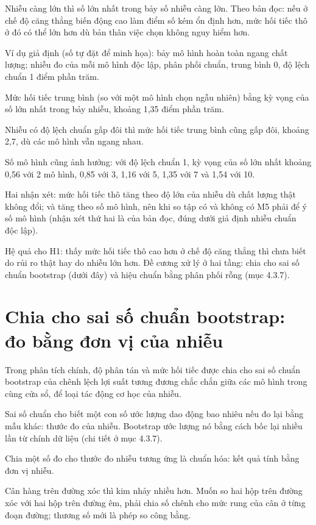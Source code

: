 Nhiễu càng lớn thì số lớn nhất trong bảy số nhiễu càng lớn. Theo bản đọc: nếu ở chế độ căng thẳng biến động cao làm điểm số kém ổn định hơn, mức hối tiếc thô ở đó có thể lớn hơn dù bản thân việc chọn không nguy hiểm hơn.

\begin{tcolorbox}[breakable]
Ví dụ giả định (số tự đặt để minh họa): bảy mô hình hoàn toàn ngang chất lượng; nhiễu đo của mỗi mô hình độc lập, phân phối chuẩn, trung bình 0, độ lệch chuẩn 1 điểm phần trăm.

Mức hối tiếc trung bình (so với một mô hình chọn ngẫu nhiên) bằng kỳ vọng của số lớn nhất trong bảy nhiễu, khoảng 1,35 điểm phần trăm.

Nhiễu có độ lệch chuẩn gấp đôi thì mức hối tiếc trung bình cũng gấp đôi, khoảng 2,7, dù các mô hình vẫn ngang nhau.

Số mô hình cũng ảnh hưởng: với độ lệch chuẩn 1, kỳ vọng của số lớn nhất khoảng 0,56 với 2 mô hình, 0,85 với 3, 1,16 với 5, 1,35 với 7 và 1,54 với 10.
\end{tcolorbox}

Hai nhận xét: mức hối tiếc thô tăng theo độ lớn của nhiễu dù chất lượng thật không đổi; và tăng theo số mô hình, nên khi so tập có và không có M5 phải để ý số mô hình (nhận xét thứ hai là của bản đọc, đúng dưới giả định nhiễu chuẩn độc lập).

Hệ quả cho H1: thấy mức hối tiếc thô cao hơn ở chế độ căng thẳng thì chưa biết do rủi ro thật hay do nhiễu lớn hơn. Đề cương xử lý ở hai tầng: chia cho sai số chuẩn bootstrap (dưới đây) và hiệu chuẩn bằng phân phối rỗng (mục 4.3.7).

\section{Chia cho sai số chuẩn bootstrap: đo bằng đơn vị của nhiễu}

Trong phân tích chính, độ phân tán và mức hối tiếc được chia cho sai số chuẩn bootstrap của chênh lệch lợi suất tương đương chắc chắn giữa các mô hình trong cùng cửa sổ, để loại tác động cơ học của nhiễu.

Sai số chuẩn cho biết một con số ước lượng dao động bao nhiêu nếu đo lại bằng mẫu khác: thước đo của nhiễu. Bootstrap ước lượng nó bằng cách bốc lại nhiều lần từ chính dữ liệu (chi tiết ở mục 4.3.7).

Chia một số đo cho thước đo nhiễu tương ứng là chuẩn hóa: kết quả tính bằng đơn vị nhiễu.

Cân hàng trên đường xóc thì kim nhảy nhiều hơn. Muốn so hai hộp trên đường xóc với hai hộp trên đường êm, phải chia số chênh cho mức rung của cân ở từng đoạn đường; thương số mới là phép so công bằng.


